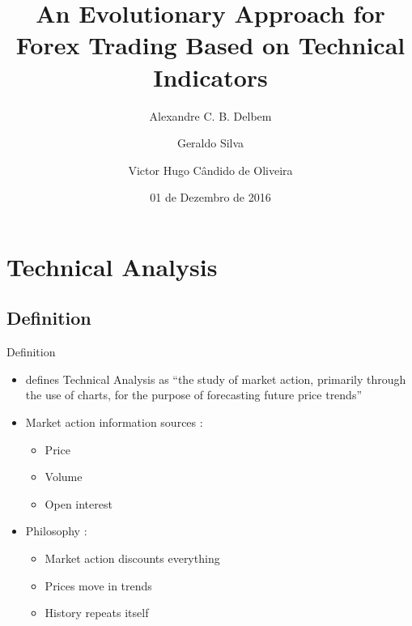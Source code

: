 \documentclass[12pt,portuguese]{beamer}
\title{An Evolutionary Approach for Forex Trading Based on Technical Indicators}
\author[Delbem, A. C. B.]{Alexandre C. B. Delbem \inst{1} \\
	\and Geraldo Silva \inst{2} \\
	\and Victor Hugo Cândido de Oliveira \inst{1}}
\institute[ICMC/USP]{\inst{1} ICMC/USP \and %
                      \inst{2} IBILCE/UNESP}
\date{01 de Dezembro de 2016}
\begin{document}



\maketitle

\section{Technical Analysis}
\subsection{Definition}
\begin{frame}{Definition}
\begin{itemize}
	\item \citet{Murphy1999} defines Technical Analysis as ``the study of market action, primarily through the use of charts, for the purpose of forecasting future price trends''

		\pause
	\item Market action information sources \citep{Murphy1999}:
	\begin{itemize}
		\item Price
		\item Volume
		\item Open interest
	\end{itemize}

		\pause
	\item Philosophy \citep{Murphy1999}:
	\begin{itemize}
		\item Market action discounts everything
		\item Prices move in trends
		\item History repeats itself
	\end{itemize}
\end{itemize}
\end{frame}
\end{document}
